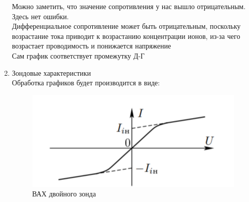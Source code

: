 \documentclass[a4paper,12pt]{article}
\begin{document}
\begin{enumerate}
\begin{figure}[h!]
\label{razr_log}
\caption{}
\end{figure}
Можно заметить, что значение сопротивления у нас вышло отрицательным. Здесь нет ошибки. \\
 Дифференциальное сопротивление может быть отрицательным, поскольку возрастание тока приводит к возрастанию концентрации ионов, из-за чего возрастает проводимость и понижается напряжение\\
Сам график соответствует промежутку Д-Г
\FloatBarrier
\item Зондовые характеристики\\
Обработка графиков будет производится в виде:
 \begin{figure}[h!]
 \centering
\includegraphics[scale=0.6]{vid.png}
\caption{ВАХ двойного зонда}
\end{figure}


\end{enumerate}
\end{document}
